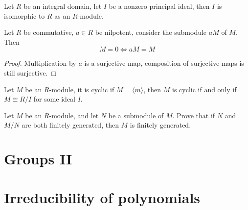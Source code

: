 \documentclass[openany]{book}
\newcommand{\la}{\langle}
\newcommand{\ra}{\rangle}
\begin{document}
\begin{prop}[5.13]
    Let $R$ be an integral domain, let $I$ be a nonzero principal ideal, then $I$ is isomorphic to $R$ as an $R$-module.
\end{prop}

\begin{prop}[5.16]
    Let $R$ be commutative, $a\in R$ be nilpotent, consider the submodule $aM$ of $M$. Then 
    \begin{equation*}
        M=0\iff aM=M
    \end{equation*}
\end{prop}
\begin{proof}
    Multiplication by $a$ is a surjective map, composition of surjective maps is still surjective.
\end{proof}


\begin{prop}[6.16]
    Let $M$ be an $R$-module, it is cyclic if $M=\la m\ra$, then $M$ is cyclic if and only if $M\cong R/I$ for some ideal $I$.
\end{prop}

\begin{prop}[6.18]
    Let \( M \) be an \( R \)-module, and let \( N \) be a submodule of \( M \). Prove that if \( N \) and \( M/N \) are both finitely generated, then \( M \) is finitely generated.
\end{prop}






\chapter{Groups II}





































\chapter{Irreducibility of polynomials}
\end{document}
